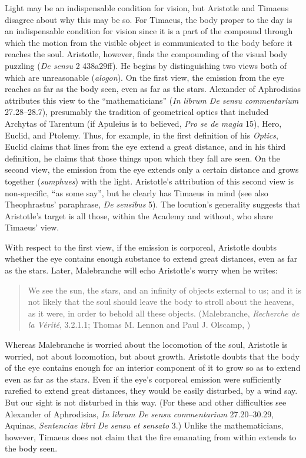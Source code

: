 Light may be an indispensable condition for vision, but Aristotle and Timaeus disagree about why this may be so. For Timaeus, the body proper to the day is an indispensable condition for vision since it is a part of the compound through which the motion from the visible object is communicated to the body before it reaches the soul. Aristotle, however, finds the compounding of the visual body puzzling (\emph{De sensu} 2 438a29ff). He begins by distinguishing two views both of which are unreasonable (\emph{alogon}). On the first view, the emission from the eye reaches as far as the body seen, even as far as the stars. Alexander of Aphrodisias attributes this view to the ``mathematicians'' (\emph{In librum De sensu commentarium} 27.28--28.7), presumably the tradition of geometrical optics that included Archytas of Tarentum (if Apuleius is to believed, \emph{Pro se de magia} 15), Hero, Euclid, and Ptolemy. Thus, for example, in the first definition of his \emph{Optics}, Euclid claims that lines from the eye extend a great distance, and in his third definition, he claims that those things upon which they fall are seen. On the second view, the emission from the eye extends only a certain distance and grows together (\emph{sumphues}) with the light. Aristotle's attribution of this second view is non-specific, ``as some say'', but he clearly has Timaeus in mind (see also Theophrastus' paraphrase, \emph{De sensibus} 5). The locution's generality suggests that Aristotle's target is all those, within the Academy and without, who share Timaeus' view.

With respect to the first view, if the emission is corporeal, Aristotle doubts whether the eye contains enough substance to extend great distances, even as far as the stars. Later, Malebranche will echo Aristotle's worry when he writes:
\begin{quote}
	We see the sun, the stars, and an infinity of objects external to us; and it is not likely that the soul should leave the body to stroll about the heavens, as it were, in order to behold all these objects. (Malebranche, \emph{Recherche de la V\'{e}rit\'{e}}, 3.2.1.1; Thomas M. Lennon and Paul J. Olscamp, \citeyear[217]{Malebranche:1997sf})
\end{quote}
Whereas Malebranche is worried about the locomotion of the soul, Aristotle is worried, not about locomotion, but about growth. Aristotle doubts that the body of the eye contains enough for an interior component of it to grow so as to extend even as far as the stars. Even if the eye's corporeal emission were sufficiently rarefied to extend great distances, they would be easily disturbed, by a wind say. But our sight is not disturbed in this way.  (For these and other difficulties see Alexander of Aphrodisias, \emph{In librum De sensu commentarium} 27.20--30.29, Aquinas, \emph{Sentenciae libri De sensu et sensato} 3.) Unlike the mathematicians, however, Timaeus does not claim that the fire emanating from within extends to the body seen.

